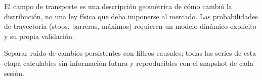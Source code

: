 

\begin{ideaclave}
El campo de transporte es una descripción geométrica de cómo cambió la distribución, no una ley física
que deba imponerse al mercado. Las probabilidades de trayectoria (stops, barreras, máximos) requieren un
modelo dinámico explícito y su propia validación.
\end{ideaclave}

\begin{criterio}
Separar ruido de cambios persistentes con filtros causales; todas las series de esta etapa calculables sin
información futura y reproducibles con el snapshot de cada sesión.
\end{criterio}
